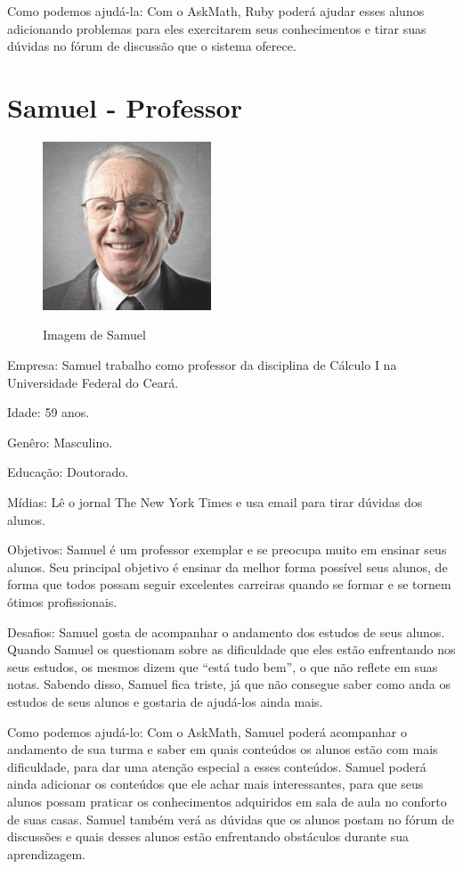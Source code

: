 Como podemos ajudá-la: Com o AskMath, Ruby poderá ajudar esses alunos adicionando problemas para eles exercitarem seus conhecimentos e tirar suas d\'uvidas no f\'orum de discuss\~ao que 
o sistema oferece.

\section{Samuel - Professor}

\begin{figure}[H]
\centering
\caption{Imagem de Samuel}
\includegraphics[width=5cm]{figuras/personas/figura_persona_3}
\label{figura_persona_3}
\end{figure}

Empresa: Samuel trabalho como professor da disciplina de C\'alculo I na
Universidade Federal do Ceará.

Idade: 59 anos.

Genêro: Masculino.

Educação: Doutorado.

Mídias: Lê o jornal The New York Times e usa email para tirar dúvidas dos alunos.

Objetivos: Samuel é um professor exemplar e se preocupa muito em ensinar seus 
alunos. Seu principal objetivo é ensinar da melhor forma possível seus alunos, 
de forma que todos possam seguir excelentes carreiras quando se formar e se 
tornem ótimos profissionais.

Desafios: Samuel gosta de acompanhar o andamento dos estudos de seus alunos. Quando Samuel os questionam sobre as dificuldade que eles est\~ao enfrentando nos seus estudos, os mesmos dizem que ``está 
tudo bem'', o que não reflete em suas notas. Sabendo disso, Samuel fica triste, já que não consegue saber como anda os estudos de seus alunos e gostaria de ajudá-los ainda mais.

Como podemos ajudá-lo: Com o AskMath, Samuel poder\'a acompanhar o andamento de sua turma e saber em quais conteúdos os alunos est\~ao com mais dificuldade, para dar uma aten\c{c}\~ao especial a 
esses conte\'udos. Samuel poderá ainda adicionar os conteúdos que ele achar mais interessantes, para que seus alunos possam praticar os conhecimentos adquiridos em sala de aula no conforto de suas 
casas. Samuel tamb\'em ver\'a as dúvidas que os alunos postam no fórum de discuss\~oes e quais desses alunos est\~ao enfrentando obstáculos durante sua aprendizagem.

